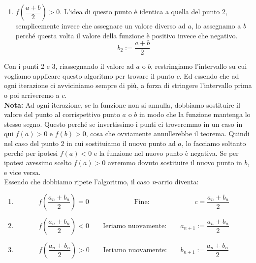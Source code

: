 {\begin{enumerate}
    \item $f\left(\dfrac{a + b}{2}\right) > 0$. L'idea di questo punto è identica a quella del punto 2, semplicemente invece che assegnare un valore diverso ad $a$, lo assegnamo a $b$ perché questa volta il valore della funzione è positivo invece che negativo.
      \begin{equation*}
        b_2 := \dfrac{a+b}{2}
      \end{equation*}
  \end{enumerate}
  Con i punti 2 e 3, riassegnando il valore ad $a$ o $b$, restringiamo l'intervallo su cui vogliamo applicare questo algoritmo per trovare il punto $c$. Ed essendo che ad ogni iterazione ci avviciniamo sempre di più, a forza di stringere l'intervallo prima o poi arriveremo a $c$.\\
  \textbf{Nota:} Ad ogni iterazione, se la funzione non si annulla, dobbiamo sostituire il valore del punto al corrispettivo punto $a$ o $b$ in modo che la funzione mantenga lo stesso segno. Questo perché se invertissimo i punti ci troveremmo in un caso in qui $f(a) > 0$ e $f(b) > 0$, cosa che ovviamente annullerebbe il teorema. Quindi nel caso del punto 2 in cui sostituiamo il nuovo punto ad $a$, lo facciamo soltanto perché per ipotesi $f(a) < 0$ e la funzione nel nuovo punto è negativa. Se per ipotesi avessimo scelto $f(a) > 0$ avremmo dovuto sostituire il nuovo punto in $b$, e vice versa.\\

  Essendo che dobbiamo ripete l'algoritmo, il caso \textit{n}-arrio diventa:
  \begin{enumerate}
    \item 
      \begin{equation*}
        f\left(\dfrac{a_n + b_n}{2}\right) = 0 \;\; \qquad \qquad \qquad \text{Fine:} \;\; \qquad \qquad \qquad c = \dfrac{a_n + b_n}{2}
      \end{equation*}

    \item 
      \begin{equation*}
        f\left(\dfrac{a_n + b_n}{2}\right) < 0 \qquad \text{Ieriamo nuovamente:} \qquad a_{n + 1}:= \dfrac{a_n + b_n}{2}
      \end{equation*}
      
    \item 
      \begin{equation*}
        f\left(\dfrac{a_n + b_n}{2}\right) > 0 \qquad \text{Ieriamo nuovamente:} \qquad b_{n + 1}:= \dfrac{a_n + b_n}{2}
      \end{equation*}


\end{enumerate}}
